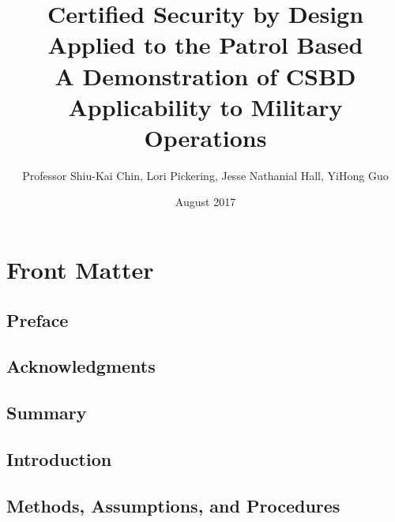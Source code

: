\documentclass{book}
\title{Certified Security by Design Applied to the Patrol Based\\
  A Demonstration of CSBD Applicability to Military Operations}
\author{Professor Shiu-Kai Chin, Lori Pickering, Jesse Nathanial Hall, YiHong Guo}
\date{August 2017}
\begin{document}
\lstset{language=ML}
\maketitle{}

\tableofcontents{}

\listoffigures

\part{Front Matter}
\label{part:front-matter}


\chapter*{Preface}
\label{cha:preface}


\chapter*{Acknowledgments}
\label{cha:acknowledgments}


\chapter*{Summary}
\label{cha:summary-1}


\chapter*{Introduction}
\label{cha:introduction-1}
%


\chapter{Methods, Assumptions, and Procedures}
\label{cha:meth-assumpt-proc-1}

\end{document}
